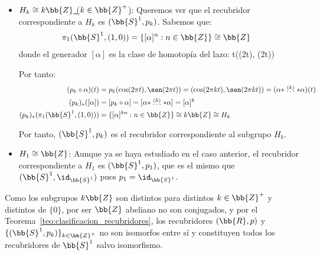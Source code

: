 \begin{ejemplo}
\begin{enumerate}
\begin{itemize}
            \item \ul{$H_k \cong k\bb{Z}$ ($k\in \bb{Z}^+$)}: Queremos ver que el recubridor correspondiente a $H_k$ es $(\bb{S}^1, p_k)$. Sabemos que:
            \begin{align*}
                \pi_1(\bb{S}^1, (1,0)) &= \{[\alpha]^n : n\in \bb{Z}\} \cong \bb{Z} 
            \end{align*}
            donde el generador $[\alpha]$ es la clase de homotopía del lazo:
                {t}{(\cos(2\pi t), \sen(2\pi t))}

            Por tanto:
            \begin{align*}
                (p_k\circ \alpha)(t) &= p_k(\cos(2\pi t), \sen(2\pi t)) = (\cos(2\pi k t), \sen(2\pi k t)) = (\alpha\ast\stackrel{(k)}{\dots}\ast\alpha)(t)\\
                (p_k)_\ast([\alpha]) &= [p_k\circ \alpha] = [\alpha\ast\stackrel{(k)}{\dots}\ast\alpha] = [\alpha]^k\\
                (p_k)_\ast(\pi_1(\bb{S}^1, (1,0))) &= \{[\alpha]^{kn} : n\in \bb{Z}\} \cong k\bb{Z} \cong H_k
            \end{align*}

            Por tanto, $(\bb{S}^1, p_k)$ es el recubridor correspondiente al subgrupo $H_k$.

            \item \ul{$H_1 \cong \bb{Z}$}: Aunque ya se haya estudiado en el caso anterior, el recubridor correspondiente a $H_1$ es $(\bb{S}^1, p_1)$, que es el mismo que $(\bb{S}^1, \id_{\bb{S}^1})$ pues $p_1 = \id_{\bb{S}^1}$.
        \end{itemize}
            
        Como los subgrupos $k\bb{Z}$ son distintos para distintos $k\in \bb{Z}^+$ y distintos de $\{0\}$, por ser $\bb{Z}$ abeliano no son conjugados, y por el Teorema~\ref{teo:clasificacion_recubridores}, los recubridores $(\bb{R}, p)$ y $\{(\bb{S}^1, p_k)\}_{k\in\bb{Z}^+}$ no son isomorfos entre sí y constituyen todos los recubridores de $\bb{S}^1$ salvo isomorfismo.


\end{enumerate}
\end{ejemplo}
